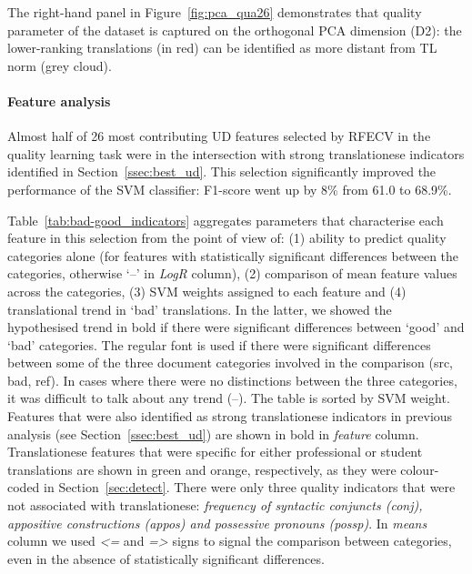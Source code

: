 The right-hand panel in Figure~\ref{fig:pca_qua26} demonstrates that quality parameter of the dataset is captured on the orthogonal PCA dimension (D2): the lower-ranking translations (in red) can be identified as more distant from TL norm (grey cloud). 

\paragraph{Feature analysis} 
Almost half of 26 most contributing UD features selected by RFECV in the quality learning task were in the intersection with strong translationese indicators identified in Section~\ref{ssec:best_ud}. This selection significantly improved the performance of the SVM classifier: F1-score went up by 8\% from 61.0 to 68.9\%. 

Table~\ref{tab:bad-good_indicators} aggregates parameters that characterise each feature in this selection from the point of view of: (1)  ability to predict quality categories alone (for features with statistically significant differences between the categories, otherwise `--' in \textit{LogR} column), (2) comparison of mean feature values across the categories, (3) SVM weights assigned to each feature and (4) translational trend in `bad' translations. 
In the latter, we showed the hypothesised trend in bold if there were significant differences between `good' and `bad' categories. The regular font is used if there were significant differences between some of the three document categories involved in the comparison (src, bad, ref). In cases where there were no distinctions between the three categories, it was difficult to talk about any trend (--). The table is sorted by SVM weight.
Features that were also identified as strong translationese indicators in previous analysis (see Section~\ref{ssec:best_ud}) are shown in bold in \textit{feature} column. Translationese features that were specific for either professional or student translations are shown in green and orange, respectively, as they were colour-coded in Section~\ref{sec:detect}. There were only three quality indicators that were not associated with translationese: \textit{frequency of syntactic conjuncts (\textit{conj}), appositive constructions (\textit{appos}) and possessive pronouns (\textit{possp})}.
In \textit{means} column we used \textit{<=} and \textit{=>} signs to signal the comparison between categories, even in the absence of statistically significant differences.

